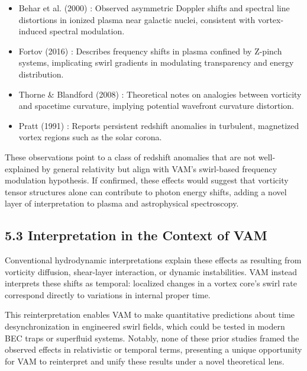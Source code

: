 \begin{itemize}

\item Behar et al. (2000) \cite{behar2000}: Observed asymmetric Doppler shifts and spectral line distortions in ionized plasma near galactic
nuclei, consistent with vortex-induced spectral modulation.

\item Fortov (2016) \cite{fortov2016}: Describes frequency shifts in plasma confined by Z-pinch systems, implicating swirl gradients in modulating
transparency and energy distribution.

\item Thorne & Blandford (2008) \cite{thorne2008}: Theoretical notes on analogies between vorticity and spacetime curvature, implying potential
wavefront curvature distortion.



\item Pratt (1991) \cite{pratt1991}: Reports persistent redshift anomalies in turbulent, magnetized vortex regions such as the solar corona.




\end{itemize}

These observations point to a class of redshift anomalies that are not well-explained by general relativity but align with VAM’s swirl-based frequency modulation hypothesis. If confirmed, these effects would suggest that vorticity tensor structures alone can contribute to photon energy shifts, adding a novel layer of interpretation to plasma and astrophysical spectroscopy.


\subsection*{5.3 Interpretation in the Context of VAM}

Conventional hydrodynamic interpretations explain these effects as resulting from vorticity diffusion, shear-layer interaction, or dynamic instabilities. VAM instead interprets these shifts as temporal: localized changes in a vortex core's swirl rate correspond directly to variations in internal proper time.


This reinterpretation enables VAM to make quantitative predictions about time desynchronization in engineered swirl fields, which could be tested in modern BEC traps or superfluid systems. Notably, none of these prior studies framed the observed effects in relativistic or temporal terms, presenting a unique opportunity for VAM to reinterpret and unify these results under a novel theoretical lens.


